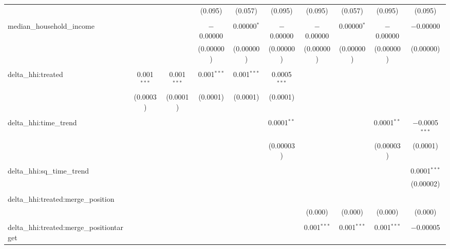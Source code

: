 \begin{table}[H]
{\begin{tabular}{@{\extracolsep{5pt}}lccccccccc}
   &  &  & (0.095) & (0.057) & (0.095) & (0.095) & (0.057) & (0.095) & (0.095) \\  

   & & & & & & & & & \\  

  median\_household\_income &  &  & $-$0.00000 & 0.00000$^{*}$ & $-$0.00000 & $-$0.00000 & 0.00000$^{*}$ & $-$0.00000 & $-$0.00000 \\  

   &  &  & (0.00000) & (0.00000) & (0.00000) & (0.00000) & (0.00000) & (0.00000) & (0.00000) \\  

   & & & & & & & & & \\  

  delta\_hhi:treated & 0.001$^{***}$ & 0.001$^{***}$ & 0.001$^{***}$ & 0.001$^{***}$ & 0.0005$^{***}$ &  &  &  &  \\  

   & (0.0003) & (0.0001) & (0.0001) & (0.0001) & (0.0001) &  &  &  &  \\  

   & & & & & & & & & \\  

  delta\_hhi:time\_trend &  &  &  &  & 0.0001$^{**}$ &  &  & 0.0001$^{**}$ & $-$0.0005$^{***}$ \\  

   &  &  &  &  & (0.00003) &  &  & (0.00003) & (0.0001) \\  

   & & & & & & & & & \\  

  delta\_hhi:sq\_time\_trend &  &  &  &  &  &  &  &  & 0.0001$^{***}$ \\  

   &  &  &  &  &  &  &  &  & (0.00002) \\  

   & & & & & & & & & \\  

  delta\_hhi:treated:merge\_position &  &  &  &  &  &  &  &  &  \\  

   &  &  &  &  &  & (0.000) & (0.000) & (0.000) & (0.000) \\  

   & & & & & & & & & \\  

  delta\_hhi:treated:merge\_positiontarget &  &  &  &  &  & 0.001$^{***}$ & 0.001$^{***}$ & 0.001$^{***}$ & $-$0.00005 \\  


\end{tabular}}
\end{table}
